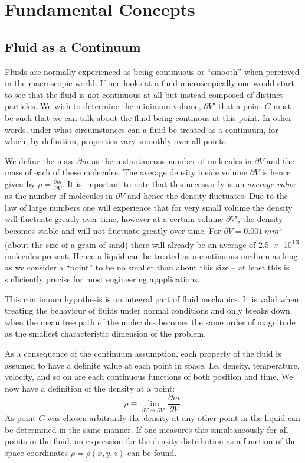 
\section{Fundamental Concepts}

\subsection{Fluid as a Continuum}
Fluids are normally experienced as being continuous or ``smooth'' when percieved in the macroscopic world. If one looks at a fluid microscopically one would start to see that the fluid is not continuous at all but instead composed of distinct particles. We wish to determine the minimum volume, $\partial V'$ that a point $C$ must be such that we can talk about the fluid being continous at this point. In other words, under what circumstances can a fluid be treated as a continuum, for which, by definition, properties vary smoothly over all points. 

We define the mass $\partial m$ as the instantaneous number of molecules in $\partial V $ and the mass of each of these molecules. The average density inside volume $\partial V $ is hence given by $\rho = \frac{\partial m }{\partial V }$. It is important to note that this necessarily is an \textit{average value} as the number of molecules in $\partial V $ and hence the density fluctuates. Due to the law of large numbers one will experience that for very small volume the density will fluctuate greatly over time, however at a certain volume $\partial V' $, the density becomes stable and will not fluctuate greatly over time. For $\partial V = \qty{0,001}{mm^3}  $ (about the size of a grain of sand) there will already be an average of \num{2,5e13} molecules present. Hence a liquid can be treated as a continuous medium as long as we consider a ``point'' to be no smaller than about this size -- at least this is sufficiently precise for most engineering appplications.

This continuum hypothesis is an integral part of fluid mechanics. It is valid when treating the behaviour of fluids under normal conditions and only breaks down when the mean free path of the molecules becomes the same order of magnitude as the smallest characteristic dimension of the problem. 

As a consequence of the continuum assumption, each property of the fluid is assumed to have a definite value at each point in space. I.e. density, temperature, velocity, and so on are each continuous functions of both position and time. We now have a definition of the density at a point:
\[ 
\rho \equiv \lim_{\partial V \to \partial V'  } \frac{\partial m }{\partial V }
.\]
As point $C$ was chosen arbitrarily the density at any other point in the liquid can be determined in the same manner. If one measures this simultaneously for all points in the fluid, an expression for the density distribution as a function of the space coordinates $\rho = \rho(x,y,z)$ can be found.

